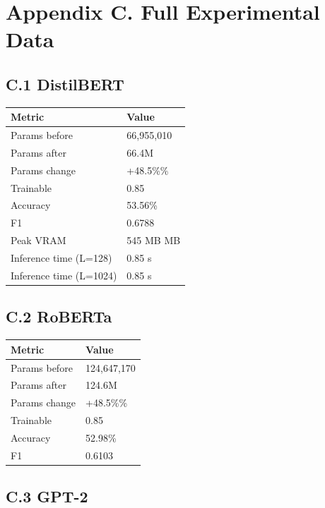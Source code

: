 \section{Appendix C. Full Experimental Data}

\subsection{C.1 DistilBERT}

\begin{table}[H]
\centering
\small
\begin{tabular}{ll}
\toprule
\textbf{Metric} & \textbf{Value} \\
\midrule
Params before & 66,955,010 \\
Params after & 66.4M \\
Params change & +48.5\%\% \\
Trainable & 0.85 \\
Accuracy & 53.56\% \\
F1 & 0.6788 \\
Peak VRAM & 545 MB MB \\
Inference time (L=128) & 0.85 s \\
Inference time (L=1024) & 0.85 s \\
\bottomrule
\end{tabular}
\end{table}

\subsection{C.2 RoBERTa}

\begin{table}[H]
\centering
\small
\begin{tabular}{ll}
\toprule
\textbf{Metric} & \textbf{Value} \\
\midrule
Params before & 124,647,170 \\
Params after & 124.6M \\
Params change & +48.5\%\% \\
Trainable & 0.85 \\
Accuracy & 52.98\% \\
F1 & 0.6103 \\
\bottomrule
\end{tabular}
\end{table}

\subsection{C.3 GPT-2}

